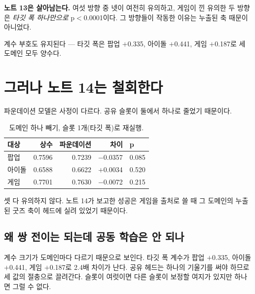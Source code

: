 \documentclass[10pt]{article}
\begin{document}
\textbf{노트 13은 살아남는다.} 여섯 방향 중 넷이 여전히 유의하고, 게임이 낀
유의한 두 방향은 \emph{타깃 폭 하나만으로} p$<$0.0001이다. 그 방향들이 작동한
이유는 누출된 축 때문이 아니었다.

계수 부호도 유지된다 --- 타깃 폭은 팝업 $+$0.335, 아이돌 $+$0.441, 게임 $+$0.187로
세 도메인 모두 양수다.

\section{그러나 노트 14는 철회한다}

파운데이션 모델은 사정이 다르다. 공유 슬롯이 둘에서 하나로 줄었기 때문이다.

\begin{table}[t]
\centering\tsize
\caption{도메인 하나 빼기, 슬롯 1개(타깃 폭)로 재실행.}
\begin{tabular}{lrrrl}
\toprule
대상 & 상수 & 파운데이션 & 차이 & p \\
\midrule
팝업   & 0.7596 & 0.7239 & $-$0.0357 & 0.085 \\
아이돌 & 0.6588 & 0.6622 & $+$0.0034 & 0.520 \\
게임   & 0.7701 & 0.7630 & $-$0.0072 & 0.215 \\
\bottomrule
\end{tabular}
\end{table}

셋 다 유의하지 않다. 노트 14가 보고한 성공은 게임을 출처로 쓸 때 그 도메인의
누출된 굿즈 축이 헤드에 실려 있었기 때문이다.


\subsection{왜 쌍 전이는 되는데 공동 학습은 안 되나}

계수 크기가 도메인마다 다르기 때문으로 보인다. 타깃 폭 계수가 팝업 $+$0.335,
아이돌 $+$0.441, 게임 $+$0.187로 2.4배 차이가 난다. 공유 헤드는 하나의 기울기를
써야 하므로 세 값의 절충으로 끌려간다. 슬롯이 여럿이면 다른 슬롯이 보정할 여지가
있지만 하나면 그럴 수 없다.

\end{document}
